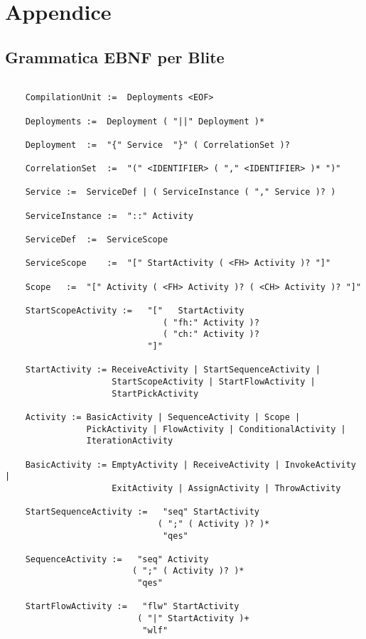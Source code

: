 \chapter*{Appendice}

\section*{Grammatica EBNF per Blite}

\begin{verbatim} 

	CompilationUnit	:=	Deployments <EOF>

	Deployments	:=	Deployment ( "||" Deployment )*

	Deployment	:=	"{" Service  "}" ( CorrelationSet )?

	CorrelationSet	:=	"(" <IDENTIFIER> ( "," <IDENTIFIER> )* ")"

	Service	:=	ServiceDef | ( ServiceInstance ( "," Service )? )

	ServiceInstance	:=	"::" Activity

	ServiceDef	:=	ServiceScope

	ServiceScope	:=	"[" StartActivity ( <FH> Activity )? "]"

	Scope	:=	"[" Activity ( <FH> Activity )? ( <CH> Activity )? "]"

	StartScopeActivity :=   "["   StartActivity 
	                           ( "fh:" Activity )? 
	                           ( "ch:" Activity )? 
	                        "]"

	StartActivity := ReceiveActivity | StartSequenceActivity | 
	                 StartScopeActivity | StartFlowActivity |
	                 StartPickActivity 

	Activity :=	BasicActivity | SequenceActivity | Scope |
	            PickActivity | FlowActivity | ConditionalActivity |
	            IterationActivity

	BasicActivity := EmptyActivity | ReceiveActivity | InvokeActivity |
	                 ExitActivity | AssignActivity | ThrowActivity

	StartSequenceActivity :=   "seq" StartActivity 
	                          ( ";" ( Activity )? )* 
	                           "qes"

	SequenceActivity :=	  "seq" Activity 
	                     ( ";" ( Activity )? )* 
	                      "qes"

	StartFlowActivity :=   "flw" StartActivity 
	                      ( "|" StartActivity )+ 
	                       "wlf"


\end{verbatim}
